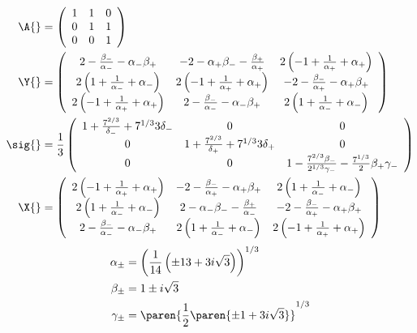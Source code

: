 \begin{equation}
  \begin{split}
    \A{}&=\left(
\begin{array}{ccc}
 1 & 1 & 0 \\
 0 & 1 & 1 \\
 0 & 0 & 1
\end{array}
\right) \\
     \Y{}&=
 \left(
\begin{array}{ccc}
 2-\frac{\beta_{-}}{\alpha_{-} }-\alpha_{-}  \beta_{+} & -2-\alpha_{+}  \beta_{-}-\frac{\beta_{+}}{\alpha_{+} } & 2 \left(-1+\frac{1}{\alpha_{+} }+\alpha_{+} \right) \\
 2 \left(1+\frac{1}{\alpha_{-} }+\alpha_{-} \right) & 2 \left(-1+\frac{1}{\alpha_{+} }+\alpha_{+} \right) & -2-\frac{\beta_{-}}{\alpha_{+} }-\alpha_{+}  \beta_{+} \\
 2 \left(-1+\frac{1}{\alpha_{+} }+\alpha_{+} \right) & 2-\frac{\beta_{-}}{\alpha_{-} }-\alpha_{-}  \beta_{+} & 2 \left(1+\frac{1}{\alpha_{-} }+\alpha_{-} \right)
\end{array}
\right)\\
     \sig{}&=\frac{1}{3}
\left(
\begin{array}{ccc}
 1+\frac{7^{2/3}}{\delta_{-}}+7^{1/3}{3} \delta_{-} & 0 & 0 \\
 0 & 1+\frac{7^{2/3}}{\delta_{+}}+7^{1/3}{3} \delta_{+} & 0 \\
 0 & 0 & 1-\frac{7^{2/3} \beta_{-}}{2^{1/3}\gamma_{-}}-\frac{7^{1/3}}{2} \beta_{+} \gamma_{-}
\end{array}
\right)\\
     \X{}&=
\left(
\begin{array}{ccc}
 2 \left(-1+\frac{1}{\alpha_{+} }+\alpha_{+} \right) & -2-\frac{\beta_{-}}{\alpha_{+} }-\alpha_{+}  \beta_{+} & 2 \left(1+\frac{1}{\alpha_{-} }+\alpha_{-} \right) \\
 2 \left(1+\frac{1}{\alpha_{-} }+\alpha_{-} \right) & 2-\alpha_{-}  \beta_{-}-\frac{\beta_{+}}{\alpha_{-} } & -2-\frac{\beta_{-}}{\alpha_{+} }-\alpha_{+}  \beta_{+} \\
 2-\frac{\beta_{-}}{\alpha_{-} }-\alpha_{-}  \beta_{+} & 2 \left(1+\frac{1}{\alpha_{-} }+\alpha_{-} \right) & 2 \left(-1+\frac{1}{\alpha_{+} }+\alpha_{+} \right)
\end{array}
\right)
  \end{split}
\end{equation}
\begin{equation}
  \begin{split}
    \alpha_{\pm} &= \left(\frac{1}{14} \left(\pm13+3 i \sqrt{3}\right)\right)^{1/3}\\
    \beta_{\pm} &= 1\pm i \sqrt{3}\\
    \gamma_{\pm} & = \paren{\frac{1}{2}\paren{\pm1+3 i \sqrt{3}}}^{1/3}
  \end{split}
\end{equation}



\endinput